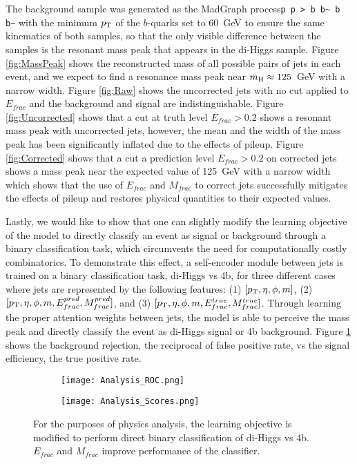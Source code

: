 The background sample was generated as the MadGraph process\newline\texttt{p p > b b\~{} b b\~{}} with the minimum $p_{\rm T}$ of the $b$-quarks set to 60~GeV to ensure the same kinematics of both samples, so that the only visible difference between the samples is the resonant mass peak that appears in the di-Higgs sample. Figure \ref{fig:MassPeak} shows the reconstructed mass of all possible pairs of jets in each event, and we expect to find a resonance mass peak near $m_{\rm H}\approx 125$~GeV with a narrow width. Figure \ref{fig:Raw} shows the uncorrected jets with no cut applied to $E_{frac}$ and the background and signal are indistinguishable. Figure \ref{fig:Uncorrected} shows that a cut at truth level $E_{frac}>0.2$ shows a resonant mass peak with uncorrected jets, however, the mean and the width of the mass peak has been significantly inflated due to the effects of pileup. Figure \ref{fig:Corrected} shows that a cut a prediction level $E_{frac}>0.2$ on corrected jets shows a mass peak near the expected value of 125~GeV with a narrow width which shows that the use of $E_{frac}$ and $M_{frac}$ to correct jets successfully mitigates the effects of pileup and restores physical quantities to their expected values.

Lastly, we would like to show that one can slightly modify the learning objective of the model to directly classify an event as signal or background through a binary classification task, which circumvents the need for computationally costly combinatorics. To demonstrate this effect, a self-encoder module between jets is trained on a binary classification task, di-Higgs vs 4b, for three different cases where jets are represented by the following features: (1) $[p_{\rm T},\eta,\phi,m]$, (2) $[p_{\rm T},\eta,\phi,m,E_{frac}^{pred}, M_{frac}^{pred}]$, and (3) $[p_{\rm T},\eta,\phi,m,E_{frac}^{true}, M_{frac}^{true}]$. Through learning the proper attention weights between jets, the model is able to perceive the mass peak and directly classify the event as di-Higgs signal or 4b background. Figure \ref{fig:ROC} shows the background rejection, the reciprocal of false positive rate, vs the signal efficiency, the true positive rate. 

\begin{figure}[h]
\centering
\begin{subfigure}{.55\textwidth}
  \texttt{[image: Analysis\_ROC.png]}
  \caption{}
  \label{fig:ROC}
\end{subfigure}%
\begin{subfigure}{.43\textwidth}
  \texttt{[image: Analysis\_Scores.png]}
  \caption{}
  \label{fig:Scores}
\end{subfigure}
\caption{For the purposes of physics analysis, the learning objective is modified to perform direct binary classification of di-Higgs vs 4b. $E_{frac}$ and $M_{frac}$ improve performance of the classifier.}
\label{fig:Analysis}
\end{figure}

